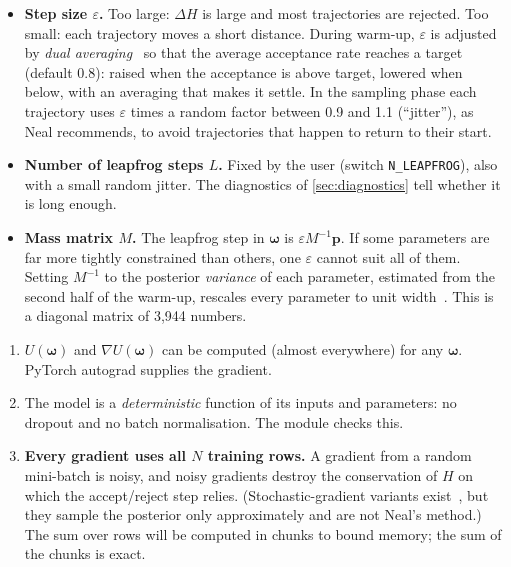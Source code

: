 \documentclass[11pt]{article}
\newcommand{\code}[1]{\texttt{#1}}
\newcommand{\bw}{\boldsymbol{\omega}}
\newcommand{\bp}{\boldsymbol{p}}
\begin{document}
\begin{itemize}
  \item \textbf{Step size $\varepsilon$.} Too large: $\Delta H$ is large and most
    trajectories are rejected. Too small: each trajectory moves a short distance.
    During warm-up, $\varepsilon$ is adjusted by \emph{dual averaging}~\cite{hoffman2014}
    so that the average acceptance rate reaches a target (default 0.8): raised when
    the acceptance is above target, lowered when below, with an averaging that makes
    it settle. In the sampling phase each trajectory uses $\varepsilon$ times a random
    factor between 0.9 and 1.1 (``jitter''), as Neal recommends, to avoid trajectories
    that happen to return to their start.
  \item \textbf{Number of leapfrog steps $L$.} Fixed by the user (switch
    \code{N\_LEAPFROG}), also with a small random jitter. The diagnostics of
    \cref{sec:diagnostics} tell whether it is long enough.
  \item \textbf{Mass matrix $M$.} The leapfrog step in $\bw$ is $\varepsilon M^{-1}\bp$.
    If some parameters are far more tightly constrained than others, one $\varepsilon$
    cannot suit all of them. Setting $M^{-1}$ to the posterior \emph{variance} of each
    parameter, estimated from the second half of the warm-up, rescales every parameter
    to unit width~\cite{neal2011}. This is a diagonal matrix of 3,944 numbers.
\end{itemize}

\begin{assume}
\begin{enumerate}
  \item $U(\bw)$ and $\nabla U(\bw)$ can be computed (almost everywhere) for any $\bw$.
    PyTorch autograd supplies the gradient.
  \item The model is a \emph{deterministic} function of its inputs and parameters:
    no dropout and no batch normalisation. The module checks this.
  \item \textbf{Every gradient uses all $N$ training rows.} A gradient from a random
    mini-batch is noisy, and noisy gradients destroy the conservation of $H$ on which
    the accept/reject step relies. (Stochastic-gradient variants exist~\cite{chen2014},
    but they sample the posterior only approximately and are not Neal's method.)
    The sum over rows will be computed in chunks to bound memory; the sum of the
    chunks is exact.
\end{enumerate}
\end{assume}
\end{document}
